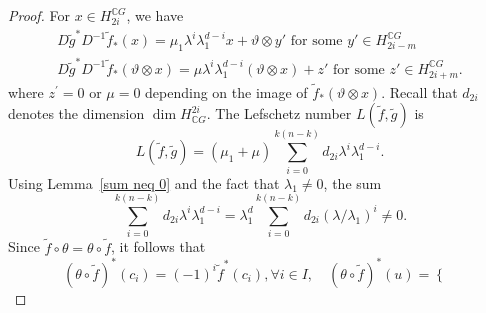 \documentclass{amsart}
\newcommand{\lemref}[1]{Lemma~\ref{#1}}
\begin{document}
\begin{proof}
	For $x\in H_{2i}^{\mathbb{C}G}$, we %
have 
	\begin{equation*}\label{D cal}
		\begin{split}
			D\tilde g^* D^{-1} \tilde f_*(x)=\mu_1 \lambda^i\lambda_1^{d-i} x + \vartheta\otimes y'\text{ for some }y' \in H^{\mathbb CG}_{2i-m}\\
			D\tilde g^* D^{-1} \tilde f_*(\vartheta\otimes x)= \mu \lambda^i\lambda_1^{d-i}(\vartheta\otimes x)+z' \text{ for some }z'\in H_{2i+m}^{\mathbb CG}.
		\end{split}
	\end{equation*}
	where %
$z^{'} =0$ or $\mu =0$ depending on the image of $\tilde{f}_*(\vartheta \otimes x)$.
	Recall that  %
$d_{2i}$ denotes the %
dimension $\dim H^{2i}_{\mathbb CG}$. The Lefschetz number  $L(\tilde{f},\tilde g)$ is
	\begin{equation*}\label{L(f,g)}
		L(\tilde f,\tilde g) =(\mu_1 + \mu) \sum_{i=0}^{k(n-k)} d_{2i} \lambda^i\lambda_1^{d-i}.
	\end{equation*}
Using  \lemref{sum neq 0} and %
the fact that $\lambda_1\neq 0$, the %
sum
	\[
	\sum_{i=0}^{k(n-k)} d_{2i} \lambda^i\lambda_1^{d-i}=\lambda_1^d\sum_{i=0}^{k(n-k)} d_{2i} (\lambda/\lambda_1)^i\neq 0.
	\]
	Since %
$\tilde f\circ\theta=\theta\circ \tilde f$, it follows that $$(\theta\circ \tilde  f )^*(c_i)= (-1)^i \tilde{f}^*(c_i), \forall i \in I, \quad (\theta \circ\tilde  f)^*(u)=\begin{cases}

\end{cases}$$
\end{proof}
\end{document}
